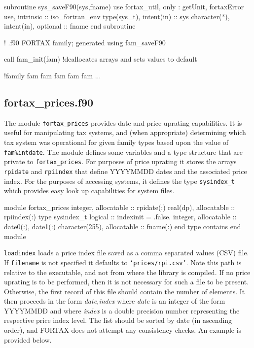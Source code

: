 \documentclass[11pt,thmsa,letter,ukenglish]{article}
\begin{document}
\begin{fortrancode}
subroutine sys_saveF90(sys,fname)
  use fortax_util, only : getUnit, fortaxError
  use, intrinsic :: iso_fortran_env
  type(sys_t),  intent(in) :: sys
  character(*), intent(in), optional :: fname
end subroutine
\end{fortrancode}

\clearpage
\begin{fortrancode}[title={Extract from \texttt{fam\_saveF90} output},frame=lines]
! .f90 FORTAX family; generated using fam_saveF90

call fam_init(fam) !deallocates arrays and sets values to default

!family
fam%
fam%
fam%
fam%
fam%
...
\end{fortrancode}

\subsection{fortax\_prices.f90}\label{sec:fortaxprices}

The module \texttt{fortax\_prices} provides date and price uprating capabilities. It is useful for manipulating tax systems, and (when appropriate) determining which tax system was operational for given family types based upon the value of \texttt{fam\%intdate}. The module defines some variables and a type structure that are private to \texttt{fortax\_prices}. For purposes of price uprating it stores the arrays \texttt{rpidate} and \texttt{rpiindex} that define YYYYMMDD dates and the associated price index. For the purposes of accessing systems, it defines the type \texttt{sysindex\_t} which provides easy look up capabilities for system files.

\begin{fortrancode}
module fortax_prices
    integer,  allocatable :: rpidate(:)
    real(dp), allocatable :: rpiindex(:)
    type sysindex_t
        logical                     :: indexinit = .false.
        integer,        allocatable :: date0(:), date1(:)
        character(255), allocatable :: fname(:)
    end type
contains
end module
\end{fortrancode}

\noindent\texttt{loadindex} loads a price index file saved as a comma separated values (CSV) file. If \texttt{filename} is not specified it defaults to \texttt{`prices/rpi.csv'}. Note this path is relative to the executable, and not from where the library is compiled. If no price uprating is to be performed, then it is not necessary for such a file to be present. Otherwise, the first record of this file should contain the number of elements. It then proceeds in the form \emph{date,index}  where \emph{date} is an integer of the form YYYYMMDD and where \emph{index} is a double precision number representing the respective price index level. The list should be sorted by date (in ascending order), and FORTAX does not attempt any consistency checks. An example is provided below.\\
\end{document}
